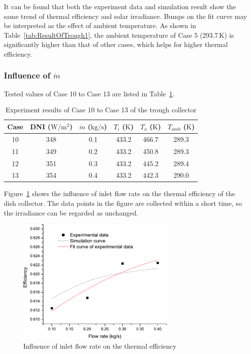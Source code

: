 It can be found that both the experiment data and simulation result show the same trend of thermal efficiency and solar irradiance. Bumps on the fit curve may be interpreted as the effect of ambient temperature. As shown in Table~\ref{tab:ResultOfTrough1}, the ambient temperature of Case 5 (293.7$\,\mathrm{K}$) is significantly higher than that of other cases, which helps for higher thermal efficiency.

\subsubsection{Influence of $\dot{m}$}
Tested values of Case 10 to Case 13 are listed in Table~\ref{tab:ResultOfTrough2}.

\begin{table}[htbp]\footnotesize
	\caption{Experiment results of Case 10 to Case 13 of the trough collector}
	\begin{center}
	\begin{tabular}{cccccc}
		\toprule
		Case	& DNI ($\mathrm{W/m^2}$)	&	$\dot{m}$ ($\mathrm{kg/s}$)			&	$T_i$ ($\mathrm{K}$)	&	$T_o$ ($\mathrm{K}$)		&	$T_{amb}$ ($\mathrm{K}$)\\
		\midrule
		10	&	348	&	0.1	&	433.2	&	466.7	&	289.3\\
		11	&	349	&	0.2	&	433.2	&	450.8	&	289.3\\
		12	&	351	&	0.3	&	433.2	&	445.2	&	289.4	\\
		13	&	354	&	0.4	&	433.2	&	442.3	&	290.0\\
		\bottomrule
	\end{tabular}
	\end{center}
	\label{tab:ResultOfTrough2}
\end{table}

Figure~\ref{fig:q_m-eta-trough} shows the influence of inlet flow rate on the thermal efficiency of the dish collector. The data points in the figure are collected within a short time, so the irradiance can be regarded as unchanged.
\begin{figure}[!ht]
\centering
\includegraphics[width=0.7\textwidth]{fig/q_m-eta-trough}
\caption{Influence of inlet flow rate on the thermal efficiency}
\label{fig:q_m-eta-trough}
\end{figure}

